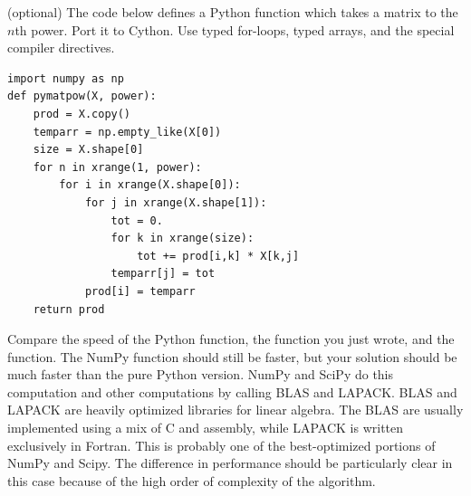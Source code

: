 \begin{problem} (optional)
The code below defines a Python function which takes a matrix to the $n$th power.
Port it to Cython.
Use typed for-loops, typed arrays, and the special compiler directives.
\begin{lstlisting}
import numpy as np
def pymatpow(X, power):
    prod = X.copy()
    temparr = np.empty_like(X[0])
    size = X.shape[0]
    for n in xrange(1, power):
        for i in xrange(X.shape[0]):
            for j in xrange(X.shape[1]):
                tot = 0.
                for k in xrange(size):
                    tot += prod[i,k] * X[k,j]
                temparr[j] = tot
            prod[i] = temparr
    return prod
\end{lstlisting}

Compare the speed of the Python function, the function you just wrote, and the  function.
The NumPy function should still be faster, but your solution should be much faster than the pure Python version.
NumPy and SciPy do this computation and other computations by calling BLAS and LAPACK.
BLAS and LAPACK are heavily optimized libraries for linear algebra.
The BLAS are usually implemented using a mix of C and assembly, while LAPACK is written exclusively in Fortran.
This is probably one of the best-optimized portions of NumPy and Scipy.
The difference in performance should be particularly clear in this case because of the high order of complexity of the algorithm.
\end{problem}

